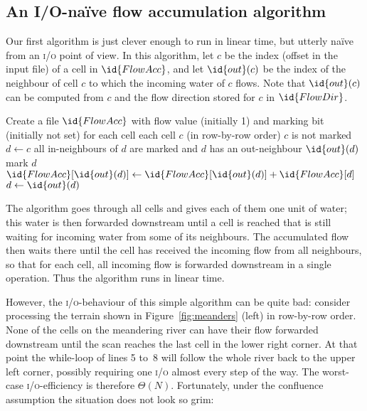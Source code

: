 \documentclass[10pt,a4paper]{article}
\def\io{\textsc{i/o}\xspace}
\begin{document}
\subsection{An I/O-na\"ive flow accumulation algorithm}\label{sec:naiveacc}

Our first algorithm is just clever enough to run in linear time, but utterly na\"ive from an \io point of view.
In this algorithm, let $c$ be the index (offset in the input file) of a cell in $\id{FlowAcc}$, and let $\id{out}(c)$ be the index of the neighbour of cell $c$ to which the incoming water of $c$ flows. Note that $\id{out}(c)$ can be computed from $c$ and the flow direction stored for $c$ in $\id{FlowDir}$.

\begin{codebox}
\li Create a file $\id{FlowAcc}$ with flow value (initially 1) and marking bit (initially not set) for each cell
\li \For each cell $c$ (in row-by-row order)
\li \Do  \If $c$ is not marked
\li      \Then  $d \gets c$
\li             \While all in-neighbours of $d$ are marked and $d$ has an out-neighbour $\id{out}(d)$
\li             \Do    mark $d$
\li                    $\id{FlowAcc}[\id{out}(d)] \gets \id{FlowAcc}[\id{out}(d)] + \id{FlowAcc}[d]$
\li                    $d \gets \id{out}(d)$
                \End
         \End
    \End
\end{codebox}

The algorithm goes through all cells and gives each of them one unit of water; this water is then forwarded downstream until a cell is reached that is still waiting for incoming water from some of its neighbours. The accumulated flow then waits there until the cell has received the incoming flow from all neighbours, so that for each cell, all incoming flow is forwarded downstream in a single operation. Thus the algorithm runs in linear time.

However, the \io-behaviour of this simple algorithm can be quite bad: consider processing the terrain shown in Figure~\ref{fig:meanders} (left) in row-by-row order. None of the cells on the meandering river can have their flow forwarded downstream until the scan reaches the last cell in the lower right corner. At that point the while-loop of lines 5 to~8 will follow the whole river back to the upper left corner, possibly requiring one \io almost every step of the way. The worst-case \io-efficiency is therefore $\Theta(N)$. Fortunately, under the confluence assumption the situation does not look so grim:
\end{document}
